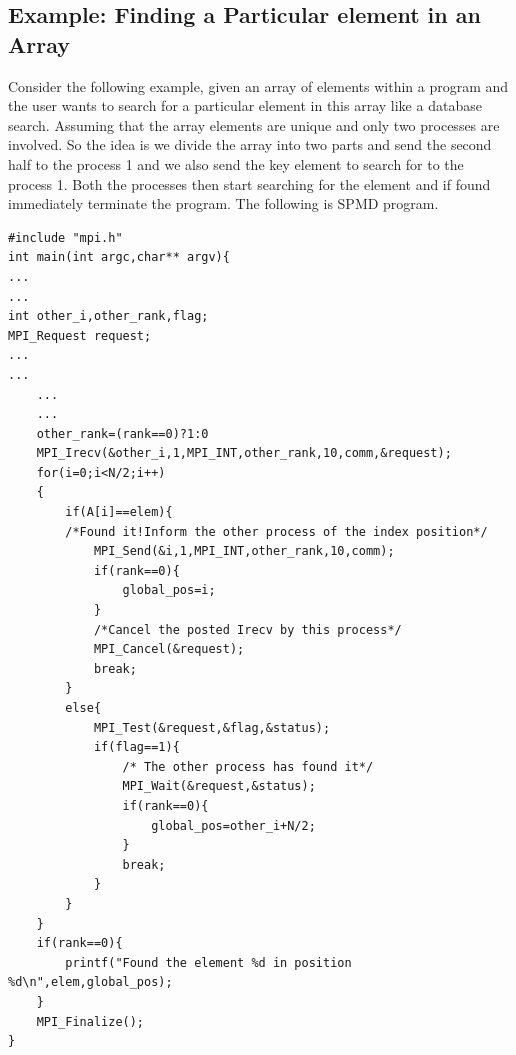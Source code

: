 \documentclass[12pt]{article}
\begin{document}
\subsection{Example: Finding a Particular element in an Array}
Consider the following example, given an array of elements within a program and the user wants to search for a particular element in this array like a database search. Assuming that the array elements are unique and only two processes are involved. So the idea is we divide the array into two parts and send the second half to the process 1 and we also send the key element to search for to the process 1. Both the processes then start searching for the element and if found immediately terminate the program. The following is SPMD program.
\begin{lstlisting}
#include "mpi.h"
int main(int argc,char** argv){
...
...
int other_i,other_rank,flag;
MPI_Request request;
...
...
    ...
    ...
    other_rank=(rank==0)?1:0
    MPI_Irecv(&other_i,1,MPI_INT,other_rank,10,comm,&request);
    for(i=0;i<N/2;i++)
    {
        if(A[i]==elem){
        /*Found it!Inform the other process of the index position*/
            MPI_Send(&i,1,MPI_INT,other_rank,10,comm);
            if(rank==0){
                global_pos=i;
            }
            /*Cancel the posted Irecv by this process*/
            MPI_Cancel(&request);
            break;
        }
        else{
            MPI_Test(&request,&flag,&status);
            if(flag==1){
                /* The other process has found it*/
                MPI_Wait(&request,&status);
                if(rank==0){
                    global_pos=other_i+N/2;
                }
                break;
            }
        }
    }
    if(rank==0){
        printf("Found the element %d in position %d\n",elem,global_pos);
    }
    MPI_Finalize();
}
\end{lstlisting}
\end{document}

